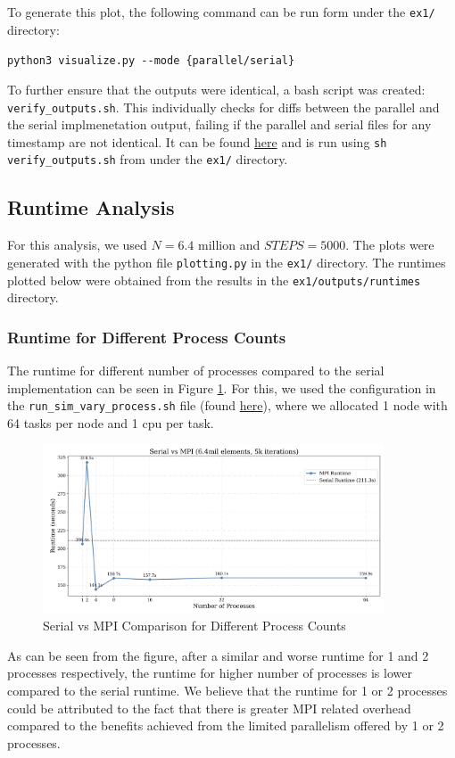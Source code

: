 \documentclass[a4paper,10pt]{article}
\begin{document}
To generate this plot, the following command can be run form under the \verb|ex1/| directory: 

\begin{center}
\verb|python3 visualize.py --mode {parallel/serial}|
\end{center}

To further ensure that the outputs were identical, a bash script was created: \verb|verify_outputs.sh|. This individually checks for diffs between the parallel and the serial implmenetation output, failing if the parallel and serial files for any timestamp are not identical. It can be found \href{https://github.com/paulmyr/DD2356-MethodsHPC/blob/master/4_mpi/ex1/verify_outputs.sh}{here} and is run using \verb|sh verify_outputs.sh| from under the \verb|ex1/| directory. 

\subsection{Runtime Analysis}
For this analysis, we used $N = 6.4\text{ million}$ and $STEPS = 5000$. The plots were generated with the python file \verb|plotting.py| in the \verb|ex1/| directory. The runtimes plotted below were obtained from the results in the \verb|ex1/outputs/runtimes| directory. 

\subsubsection{Runtime for Different Process Counts}
\label{sec:diff_process_counts}
The runtime for different number of processes compared to the serial implementation can be seen in Figure \ref{fig:ex1_process_counts}. For this, we used the configuration in the \verb|run_sim_vary_process.sh| file (found \href{https://github.com/paulmyr/DD2356-MethodsHPC/blob/master/4_mpi/ex1/run_sim_vary_process.sh}{here}), where we allocated 1 node with 64 tasks per node and 1 cpu per task.

\begin{figure}[H]
  \centering
  \includegraphics[width=0.9\textwidth]{img/ex1/serial_vs_mpi}
  \caption{Serial vs MPI Comparison for Different Process Counts}
  \label{fig:ex1_process_counts}
\end{figure}
As can be seen from the figure, after a similar and worse runtime for 1 and 2 processes respectively, the runtime for higher number of processes is lower compared to the serial runtime. We believe that the runtime for 1 or 2 processes could be attributed to the fact that there is greater MPI related overhead compared to the benefits achieved from the limited parallelism offered by 1 or 2 processes.
 
\end{document}
